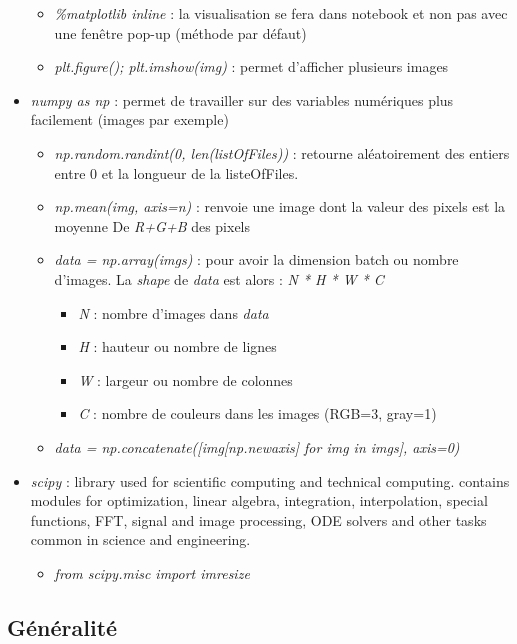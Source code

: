 \documentclass[12pt,a4paper]{article}
\begin{document}
\begin{itemize}
\begin{itemize}
\item \textit{\%matplotlib inline} : la visualisation se fera dans notebook et non pas avec une fenêtre pop-up (méthode par défaut)
\item \textit{plt.figure(); plt.imshow(img)} : permet d'afficher plusieurs images
\end{itemize}
\item \textit{numpy as np} : permet de travailler sur des variables numériques plus facilement (images par exemple)
\begin{itemize}
\item \textit{np.random.randint(0, len(listOfFiles))} : retourne aléatoirement des entiers entre 0 et la longueur de la listeOfFiles.\\
\item \textit{np.mean(img, axis=n)} : renvoie une image dont la valeur des pixels est la moyenne De \textit{R+G+B} des pixels
\item \textit{data = np.array(imgs)} : pour avoir la dimension batch ou nombre d'images. La \textit{shape} de \textit{data} est alors : \textit{N * H * W * C}
\begin{itemize}
\item \textit{N} : nombre d'images dans \textit{data}
\item \textit{H} : hauteur ou nombre de lignes
\item \textit{W} : largeur ou nombre de colonnes
\item \textit{C} : nombre de couleurs dans les images (RGB=3, gray=1)
\end{itemize}
\item \textit{data = np.concatenate([img[np.newaxis] for img in imgs], axis=0)}
\end{itemize}
\item \textit{scipy} : library used for scientific computing and technical computing. contains modules for optimization, linear algebra, integration, interpolation, special functions, FFT, signal and image processing, ODE solvers and other tasks common in science and engineering. 
\begin{itemize}
\item \textit{from scipy.misc import imresize}
\end{itemize}
\end{itemize}

\subsection{Généralité}
\end{document}
